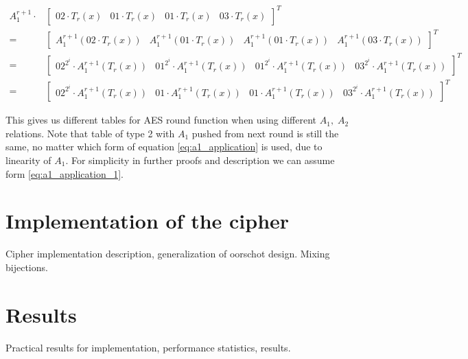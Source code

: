 \documentclass[11pt,oneside,final]{fithesis2}
\begin{document}
	
	{%
	\begin{subequations}\label{eq:a1_application}
	\begin{align}
	       A_1^{r+1} \cdot &\begin{bmatrix}           02 \cdot T_r(x)        &           01 \cdot T_r(x)        &           01 \cdot T_r(x)        &           03 \cdot T_r(x)        \end{bmatrix}^T \label{eq:a1_application_1} \\
	    =                  &\begin{bmatrix} A_1^{r+1}(02 \cdot T_r(x))       & A_1^{r+1}(01 \cdot T_r(x))       & A_1^{r+1}(01 \cdot T_r(x))       & A_1^{r+1}(03 \cdot T_r(x))       \end{bmatrix}^T \nonumber\\
	    =                  &\begin{bmatrix} 02^{2^i} \cdot A_1^{r+1}(T_r(x)) & 01^{2^i} \cdot A_1^{r+1}(T_r(x)) & 01^{2^i} \cdot A_1^{r+1}(T_r(x)) & 03^{2^i} \cdot A_1^{r+1}(T_r(x)) \end{bmatrix}^T \nonumber\\
	    =                  &\begin{bmatrix} 02^{2^i} \cdot A_1^{r+1}(T_r(x)) & 01 \cdot A_1^{r+1}(T_r(x))       & 01 \cdot A_1^{r+1}(T_r(x))       & 03^{2^i} \cdot A_1^{r+1}(T_r(x)) \end{bmatrix}^T
	\end{align}
	\end{subequations}}
	
	This gives us different tables for AES round function when using different $A_1,\;A_2$ relations. Note that table of type 2 with $A_1$ pushed from next round 
	is still the same, no matter which form of equation \ref{eq:a1_application} is used, due to linearity of $A_1$. 
	For simplicity in further proofs and description we can assume form \ref{eq:a1_application_1}.

    \section{Implementation of the cipher}
    Cipher implementation description, generalization of oorschot design. Mixing bijections.

    \section{Results}
    Practical results for implementation, performance statistics, results.
    
\end{document}
